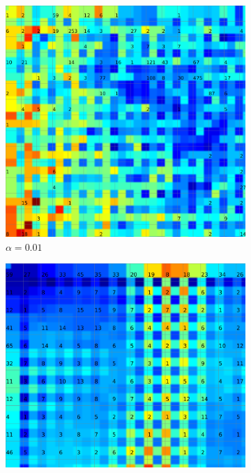 \documentclass{acm_proc_article-sp}
\begin{document}
\begin{figure}
\centering
    \centering
    \begin{subfigure}[b]{0.24\linewidth}
        \includegraphics[width=\linewidth]{img/wine-20x16-u-matrix-alpha-0,01}
        \caption{$\alpha=0.01$}
        \label{fig:wine-20x16-u-matrix-alpha-0,01}
    \end{subfigure}
    \begin{subfigure}[b]{0.24\linewidth}
        \includegraphics[width=\linewidth]{img/wine-20x16-u-matrix-alpha-0,45}

\end{subfigure}
\end{figure}
\end{document}
